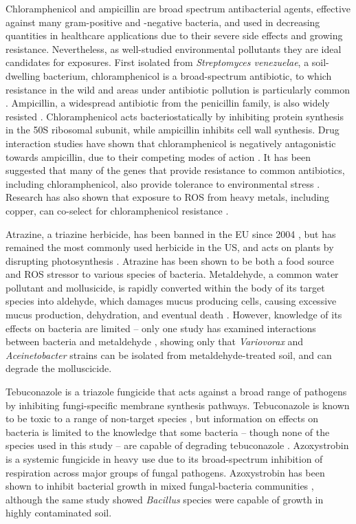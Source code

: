 \documentclass[final,1p,times]{elsarticle}
\begin{document}
Chloramphenicol and ampicillin are broad spectrum antibacterial agents, effective against many gram-positive and -negative bacteria, and used in decreasing quantities in healthcare applications due to their severe side effects and growing resistance. Nevertheless, as well-studied environmental pollutants they are ideal candidates for exposures. First isolated from \textit{Streptomyces venezuelae}, a soil-dwelling bacterium, chloramphenicol is a broad-spectrum antibiotic, to which resistance in the wild and areas under antibiotic pollution is particularly common \cite{Allen2010}. Ampicillin, a widespread antibiotic from the penicillin family, is also widely resisted \cite{Ruiz1999MechanismsFish}. Chloramphenicol acts bacteriostatically by inhibiting protein synthesis in the 50S ribosomal subunit, while ampicillin inhibits cell wall synthesis. Drug interaction studies have shown that chloramphenicol is negatively antagonistic towards ampicillin, due to their competing modes of action \cite{vanBambeke2017MechanismsAction}. It has been suggested that many of the genes that provide resistance to common antibiotics, including chloramphenicol, also provide tolerance to environmental stress \cite{Groh2007}. Research has also shown that exposure to ROS from heavy metals, including copper, can co-select for chloramphenicol resistance \cite{Harrison2009}.

Atrazine, a triazine herbicide, has been banned in the EU since 2004 \cite{EU2004}, but has remained the most commonly used herbicide in the US, and acts on plants by disrupting photosynthesis \cite{Shimabukuro1969}. Atrazine has been shown to be both a food source \cite{Wackett2002} and ROS stressor \cite{Zhang2012} to various species of bacteria. Metaldehyde, a common water pollutant and mollusicide, is rapidly converted within the body of its target species into aldehyde, which damages mucus producing cells, causing excessive mucus production, dehydration, and eventual death \cite{Triebskorn1998}. However, knowledge of its effects on bacteria are limited -- only one study has examined interactions between bacteria and metaldehyde \cite{Thomas2017}, showing only that \textit{Variovorax} and \textit{Aceinetobacter} strains can be isolated from metaldehyde-treated soil, and can degrade the molluscicide.

Tebuconazole is a triazole fungicide that acts against a broad range of pathogens by inhibiting fungi-specific membrane synthesis pathways. Tebuconazole is known to be toxic to a range of non-target species \cite{Sehnem2010}, but information on effects on bacteria is limited to the knowledge that some bacteria -- though none of the species used in this study -- are capable of degrading tebuconazole \cite{Sehnem2010}. Azoxystrobin is a systemic fungicide in heavy use due to its broad-spectrum inhibition of respiration across major groups of fungal pathogens. Azoxystrobin has been shown to inhibit bacterial growth in mixed fungal-bacteria communities \cite{Bacmaga2015MicrobialAzoxystrobin}, although the same study showed \textit{Bacillus} species were capable of growth in highly contaminated soil.
\end{document}
